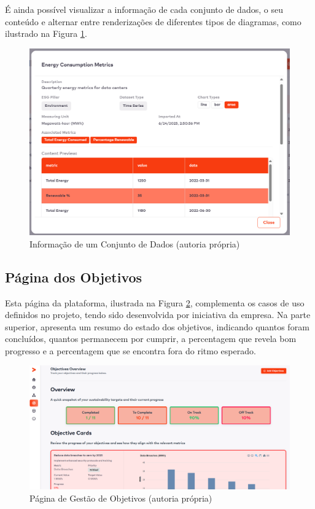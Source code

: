 É ainda possível visualizar a informação de cada conjunto de dados, o seu conteúdo e alternar entre renderizações de diferentes tipos de diagramas, como ilustrado na Figura \ref{fig:dataset_info}.

\begin{figure}[H]
    \centering
    \includegraphics[width=5in,keepaspectratio]{frontmatter/assets/platform_prints/dataset/dataset_info.png}
    \caption{Informação de um Conjunto de Dados (autoria própria)}
    \label{fig:dataset_info}
\end{figure}

\subsection{Página dos Objetivos}

Esta página da plataforma, ilustrada na Figura \ref{fig:objectives_done}, complementa os casos de uso definidos no projeto, tendo sido desenvolvida por iniciativa da empresa. Na parte superior, apresenta um resumo do estado dos objetivos, indicando quantos foram concluídos, quantos permanecem por cumprir, a percentagem que revela bom progresso e a percentagem que se encontra fora do ritmo esperado.

\begin{figure}[H]
    \centering
    \includegraphics[width=\linewidth,keepaspectratio]{frontmatter/assets/platform_prints/objetives/objective_done.png}
    \caption{Página de Gestão de Objetivos (autoria própria)}
    \label{fig:objectives_done}
\end{figure}

